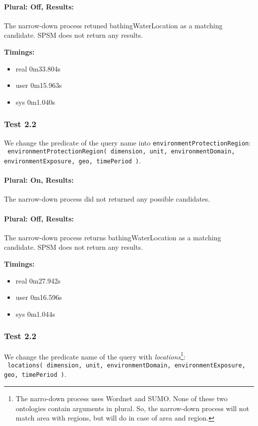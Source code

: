 \documentclass[a4paper,10pt]{article}
\begin{document}
\paragraph{Plural: Off, Results: }	The narrow-down process retuned bathingWaterLocation
 as a matching candidate. SPSM does not return any results.
 
 \textbf{Timings:}
 \begin{itemize}
\item real	0m33.804s
\item user	0m15.963s
\item sys	0m1.040s

 \end{itemize}
	
	
\subsubsection{Test 2.2} We change the predicate of the query name into \texttt{environmentProtectionRegion}:\\
\indent \texttt{ environmentProtectionRegion( dimension, unit, environmentDomain, environmentExposure, geo, timePeriod )}.

\paragraph{Plural: On, Results: } The narrow-down process did not returned any possible candidates.

\paragraph{Plural: Off, Results: }The narrow-down process returns bathingWaterLocation as a matching candidate. SPSM does not return any results. 

\textbf{Timings:}
\begin{itemize}
\item real	0m27.942s
\item user	0m16.596s
\item sys	0m1.044s

\end{itemize}


\subsubsection{Test 2.2} We change  the predicate name of the query with \textit{locations}\footnote{The narro-down process uses Wordnet and SUMO. None of these two ontologies contain arguments in plural. So, the narrow-down process will not match area with regions, but will do in case of area and region. }: \\
\indent \texttt{ locations( dimension, unit, environmentDomain, environmentExposure, geo, timePeriod )}.
\end{document}
